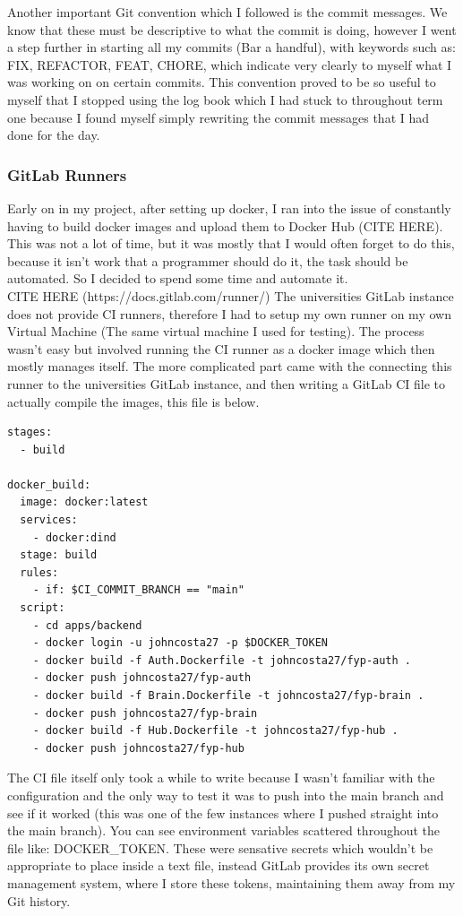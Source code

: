 \documentclass[titlepage]{article}
\begin{document}
Another important Git convention which I followed is the commit messages. We know that these must be descriptive to what the commit is doing, however I went a step further in starting all my commits (Bar a handful), with keywords such as: FIX, REFACTOR, FEAT, CHORE, which indicate very clearly to myself what I was working on on certain commits. This convention proved to be so useful to myself that I stopped using the log book which I had stuck to throughout term one because I found myself simply rewriting the commit messages that I had done for the day. 

\pagebreak
\subsubsection{GitLab Runners}
Early on in my project, after setting up docker, I ran into the issue of constantly having to build docker images and upload them to Docker Hub (CITE HERE). This was not a lot of time, but it was mostly that I would often forget to do this, because it isn't work that a programmer should do it, the task should be automated. So I decided to spend some time and automate it. \\

CITE HERE (https://docs.gitlab.com/runner/)
The universities GitLab instance does not provide CI runners, therefore I had to setup my own runner on my own Virtual Machine (The same virtual machine I used for testing). The process wasn't easy but involved running the CI runner as a docker image which then mostly manages itself. The more complicated part came with the connecting this runner to the universities GitLab instance, and then writing a GitLab CI file to actually compile the images, this file is below.

\begin{verbatim}
stages:
  - build

docker_build:
  image: docker:latest
  services:
    - docker:dind
  stage: build
  rules:
    - if: $CI_COMMIT_BRANCH == "main"
  script:
    - cd apps/backend
    - docker login -u johncosta27 -p $DOCKER_TOKEN
    - docker build -f Auth.Dockerfile -t johncosta27/fyp-auth .
    - docker push johncosta27/fyp-auth
    - docker build -f Brain.Dockerfile -t johncosta27/fyp-brain .
    - docker push johncosta27/fyp-brain
    - docker build -f Hub.Dockerfile -t johncosta27/fyp-hub .
    - docker push johncosta27/fyp-hub
\end{verbatim}

The CI file itself only took a while to write because I wasn't familiar with the configuration and the only way to test it was to push into the main branch and see if it worked (this was one of the few instances where I pushed straight into the main branch). You can see environment variables scattered throughout the file like: DOCKER\_TOKEN. These were sensative secrets which wouldn't be appropriate to place inside a text file, instead GitLab provides its own secret management system, where I store these tokens, maintaining them away from my Git history. \\
\end{document}
